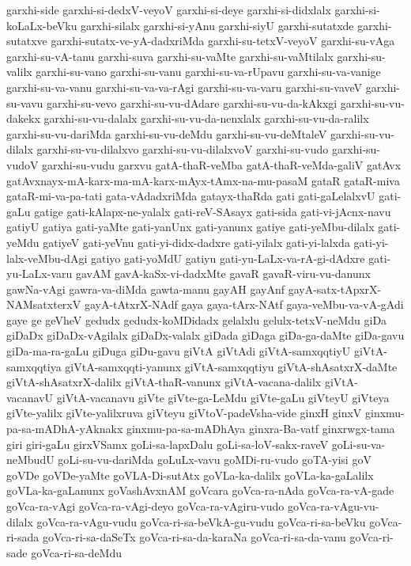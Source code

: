 {garxhi-side
garxhi-si-dedxV-veyoV
garxhi-si-deye
garxhi-si-didxlalx
garxhi-si-koLaLx-beVku
garxhi-silalx
garxhi-si-yAnu
garxhi-siyU
garxhi-sutatxde
garxhi-sutatxve
garxhi-sutatx-ve-yA-dadxriMda
garxhi-su-tetxV-veyoV
garxhi-su-vAga
garxhi-su-vA-tanu
garxhi-suva
garxhi-su-vaMte
garxhi-su-vaMtilalx
garxhi-su-valilx
garxhi-su-vano
garxhi-su-vanu
garxhi-su-va-rUpavu
garxhi-su-va-vanige
garxhi-su-va-vanu
garxhi-su-va-va-rAgi
garxhi-su-va-varu
garxhi-su-vaveV
garxhi-su-vavu
garxhi-su-vevo
garxhi-su-vu-dAdare
garxhi-su-vu-da-kAkxgi
garxhi-su-vu-dakekx
garxhi-su-vu-dalalx
garxhi-su-vu-da-nenxlalx
garxhi-su-vu-da-ralilx
garxhi-su-vu-dariMda
garxhi-su-vu-deMdu
garxhi-su-vu-deMtaleV
garxhi-su-vu-dilalx
garxhi-su-vu-dilalxvo
garxhi-su-vu-dilalxvoV
garxhi-su-vudo
garxhi-su-vudoV
garxhi-su-vudu
garxvu
gatA-thaR-veMba
gatA-thaR-veMda-galiV
gatAvx
gatAvxnayx-mA-karx-ma-mA-karx-mAyx-tAmx-na-mu-pasaM
gataR
gataR-miva
gataR-mi-va-pa-tati
gata-vAdadxriMda
gatayx-thaRda
gati
gati-gaLelalxvU
gati-gaLu
gatige
gati-kAlapx-ne-yalalx
gati-reV-SAsayx
gati-sida
gati-vi-jAcnx-navu
gatiyU
gatiya
gati-yaMte
gati-yanUnx
gati-yanunx
gatiye
gati-yeMbu-dilalx
gati-yeMdu
gatiyeV
gati-yeVnu
gati-yi-didx-dadxre
gati-yilalx
gati-yi-lalxda
gati-yi-lalx-veMbu-dAgi
gatiyo
gati-yoMdU
gatiyu
gati-yu-LaLx-va-rA-gi-dAdxre
gati-yu-LaLx-varu
gavAM
gavA-kaSx-vi-dadxMte
gavaR
gavaR-viru-vu-danunx
gawNa-vAgi
gawra-va-diMda
gawta-manu
gayAH
gayAnf
gayA-satx-tApxrX-NAMsatxterxV
gayA-tAtxrX-NAdf
gaya
gaya-tArx-NAtf
gaya-veMbu-va-vA-gAdi
gaye
ge
geVheV
gedudx
gedudx-koMDidadx
gelalxlu
gelulx-tetxV-neMdu
giDa
giDaDx
giDaDx-vAgilalx
giDaDx-valalx
giDada
giDaga
giDa-ga-daMte
giDa-gavu
giDa-ma-ra-gaLu
giDuga
giDu-gavu
giVtA
giVtAdi
giVtA-samxqqtiyU
giVtA-samxqqtiya
giVtA-samxqqti-yanunx
giVtA-samxqqtiyu
giVtA-shAsatxrX-daMte
giVtA-shAsatxrX-dalilx
giVtA-thaR-vanunx
giVtA-vacana-dalilx
giVtA-vacanavU
giVtA-vacanavu
giVte
giVte-ga-LeMdu
giVte-gaLu
giVteyU
giVteya
giVte-yalilx
giVte-yalilxruva
giVteyu
giVtoV-padeVsha-vide
ginxH
ginxV
ginxmu-pa-sa-mADhA-yAknakx
ginxmu-pa-sa-mADhAya
ginxra-Ba-vatf
ginxrwgx-tama
giri
giri-gaLu
girxVSamx
goLi-sa-lapxDalu
goLi-sa-loV-sakx-raveV
goLi-su-va-neMbudU
goLi-su-vu-dariMda
goLuLx-vavu
goMDi-ru-vudo
goTA-yisi
goV
goVDe
goVDe-yaMte
goVLA-Di-sutAtx
goVLa-ka-dalilx
goVLa-ka-gaLalilx
goVLa-ka-gaLanunx
goVashAvxnAM
goVcara
goVca-ra-nAda
goVca-ra-vA-gade
goVca-ra-vAgi
goVca-ra-vAgi-deyo
goVca-ra-vAgiru-vudo
goVca-ra-vAgu-vu-dilalx
goVca-ra-vAgu-vudu
goVca-ri-sa-beVkA-gu-vudu
goVca-ri-sa-beVku
goVca-ri-sada
goVca-ri-sa-daSeTx
goVca-ri-sa-da-karaNa
goVca-ri-sa-da-vanu
goVca-ri-sade
goVca-ri-sa-deMdu
}
